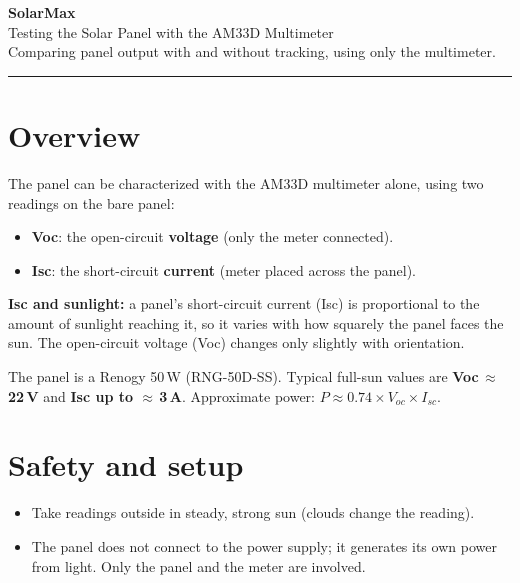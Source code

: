 \documentclass[11pt]{article}
\begin{document}
\begin{center}
{\Huge\bfseries\color{brandblue} SolarMax}\\[4pt]
{\LARGE Testing the Solar Panel with the AM33D Multimeter}\\[8pt]
{\large Comparing panel output with and without tracking, using only the multimeter.}\\[6pt]
\rule{0.9\linewidth}{0.8pt}
\end{center}

\vspace{4pt}
\tableofcontents
\vspace{8pt}

\section{Overview}
The panel can be characterized with the AM33D multimeter alone, using two readings on
the bare panel:
\begin{itemize}[leftmargin=1.6em]
  \item \textbf{Voc}: the open-circuit \textbf{voltage} (only the meter connected).
  \item \textbf{Isc}: the short-circuit \textbf{current} (meter placed across the panel).
\end{itemize}

\begin{note}
\textbf{Isc and sunlight:} a panel's short-circuit current (Isc) is proportional to the
amount of sunlight reaching it, so it varies with how squarely the panel faces the sun.
The open-circuit voltage (Voc) changes only slightly with orientation.
\end{note}

The panel is a Renogy 50\,W (RNG-50D-SS). Typical full-sun values are
\textbf{Voc\,$\approx$\,22\,V} and \textbf{Isc up to $\approx$\,3\,A}. Approximate power:
$P \approx 0.74 \times V_{oc} \times I_{sc}$.

\section{Safety and setup}
\begin{itemize}[leftmargin=1.6em]
  \item Take readings outside in steady, strong sun (clouds change the reading).
  \item The panel does not connect to the power supply; it generates its own power from
        light. Only the panel and the meter are involved.
\end{itemize}
\end{document}
